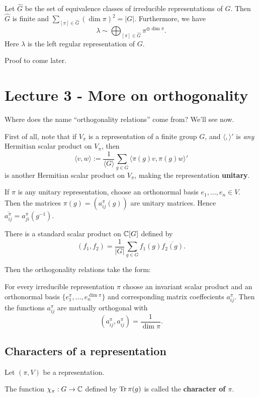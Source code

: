 \documentclass[11pt, english]{article}
\begin{document}
\begin{thm}
Let $\hat G$ be the set of equivalence classes of irreducible representations of $G$. Then $\hat G$ is finite and $\sum_{[\pi] \in \hat G} (\dim \pi)^2 = \lvert G \rvert$. Furthermore, we have
$$
\lambda \sim  \bigoplus_{[\pi] \in \hat G} \pi^{\oplus \dim \pi}.
$$
Here $\lambda$ is the left regular representation of $G$.
\end{thm}
Proof to come later.

\section{Lecture 3 - More on orthogonality}

Where does the name ``orthogonality relations'' come from? We'll see now.

First of all, note that if $V_\pi$ is a representation of a finite group $G$, and $\langle,\rangle'$ is \emph{any} Hermitian scalar product on $V_\pi$, then 
$$
\langle v, w \rangle := \frac{1}{\langle G \rangle} \sum_{g \in G} \langle \pi(g) v, \pi(g) w \rangle'
$$
is another Hermitian scalar product on $V_\pi$, making the representation \textbf{unitary}.

If $\pi$ is any unitary representation, choose an orthonormal basis $e_1,\ldots,e_n \in V$. Then the matrices $\pi(g) = \left( a_{ij}^\pi(g) \right)$ are unitary matrices. Hence $\overline{a_{ij}^\pi} = a_{ji}^\pi(g^{-1})$.

There is a standard scalar product on $\mathbb{C}[G]$ defined by
$$
(f_1,f_2) = \frac 1{\lvert G \rvert} \sum_{g \in G} f_1(g) \overline{f_2(g)}.
$$

Then the orthogonality relations take the form:

\begin{thm}
 For every irreducible representation $\pi$ choose an invariant scalar product and an orthonormal basis $\{e_1^\pi, \ldots, e_n^{\dim \pi}\}$ and corresponding matrix coeffecients $a_{ij}^\pi$. Then the functions $a_{ij}^\pi$ are mutually orthogonal with
$$
\left (a_{ij}^\pi, a_{ij}^\pi\right) = \frac{1}{\dim \pi}.
$$
\end{thm}

\subsection{Characters of a representation}

Let $(\pi,V)$ be a representation. 

The function $\chi_\pi:G \to \mathbb{C}$ defined by $\operatorname{Tr} \pi(g)$ is called the \textbf{character of $\pi$}.
\end{document}
